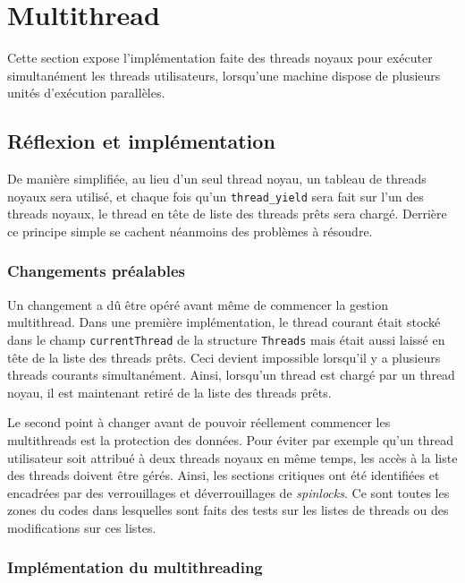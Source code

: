 \documentclass[a4paper,11pt]{article}
\begin{document}
\section{Multithread}

Cette section expose l'implémentation faite des threads noyaux pour exécuter simultanément les threads utilisateurs, lorsqu'une machine dispose
de plusieurs unités d'exécution parallèles.

\subsection{Réflexion et implémentation}

De manière simplifiée, au lieu d'un seul thread noyau, un tableau de threads noyaux sera utilisé, et chaque fois qu'un \texttt{thread\_yield} sera fait sur l'un des threads noyaux, le thread en tête de liste des threads prêts sera chargé. Derrière ce principe simple se cachent néanmoins des problèmes à résoudre.

\subsubsection*{Changements préalables}

Un changement a dû être opéré avant même de commencer la gestion multithread. Dans une première implémentation, le thread courant était stocké dans le champ \texttt{currentThread} de la structure \texttt{Threads} mais était aussi laissé en tête de la liste des threads prêts. Ceci devient impossible lorsqu'il y a plusieurs threads courants simultanément. Ainsi, lorsqu'un thread est chargé par un thread noyau, il est maintenant retiré de la liste des threads prêts.

Le second point à changer avant de pouvoir réellement commencer les multithreads est la protection des données. Pour éviter par exemple qu'un thread utilisateur soit attribué à deux threads noyaux en même temps, les accès à la liste des threads doivent être gérés. Ainsi, les sections critiques ont été identifiées et encadrées par des verrouillages et déverrouillages de \textit{spinlocks}. Ce sont toutes les zones du codes dans lesquelles sont faits des tests sur les listes de threads ou des modifications sur ces listes.

\subsubsection*{Implémentation du multithreading}
\end{document}
